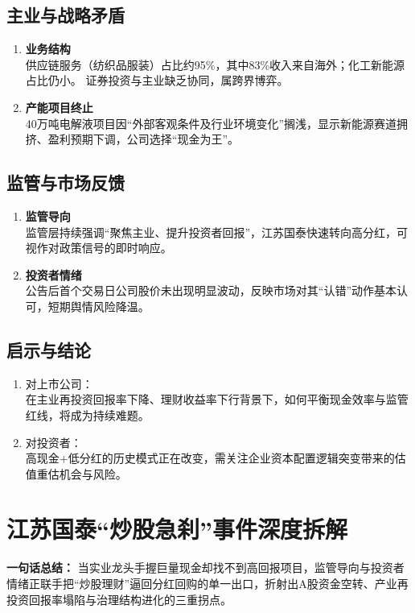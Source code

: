\subsection{主业与战略矛盾}
\begin{enumerate}[leftmargin=*, nosep]
    \item \textbf{业务结构}  \\
    供应链服务（纺织品服装）占比约95\%，其中83\%收入来自海外；化工新能源占比仍小。  
    证券投资与主业缺乏协同，属跨界博弈。
    \item \textbf{产能项目终止}  \\
    40万吨电解液项目因“外部客观条件及行业环境变化”搁浅，显示新能源赛道拥挤、盈利预期下调，公司选择“现金为王”。
\end{enumerate}

\subsection{监管与市场反馈}
\begin{enumerate}[leftmargin=*, nosep]
    \item \textbf{监管导向}  \\
    监管层持续强调“聚焦主业、提升投资者回报”，江苏国泰快速转向高分红，可视作对政策信号的即时响应。
    \item \textbf{投资者情绪}  \\
    公告后首个交易日公司股价未出现明显波动，反映市场对其“认错”动作基本认可，短期舆情风险降温。
\end{enumerate}

\subsection{启示与结论}
\begin{enumerate}[leftmargin=*, nosep]
    \item 对上市公司：  \\
    在主业再投资回报率下降、理财收益率下行背景下，如何平衡现金效率与监管红线，将成为持续难题。
    \item 对投资者：  \\
    {\color{red}高现金$+$低分红的历史模式正在改变，需关注企业资本配置逻辑突变带来的估值重估机会与风险。}
\end{enumerate}


\section{江苏国泰“炒股急刹”事件深度拆解}
\textbf{一句话总结：}  
当实业龙头手握巨量现金却找不到高回报项目，监管导向与投资者情绪正联手把“炒股理财”逼回分红回购的单一出口，折射出{\color{red}A股资金空转、产业再投资回报率塌陷与治理结构进化}的三重拐点。

